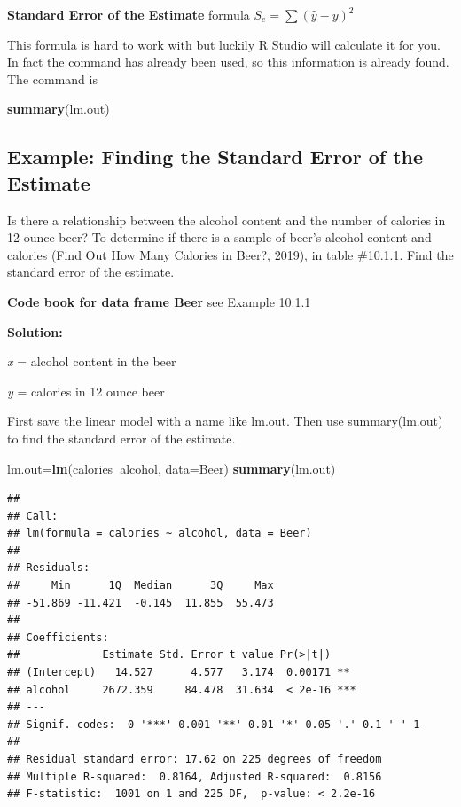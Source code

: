 \documentclass[
]{book}
\newenvironment{Shaded}{\begin{snugshade}}{\end{snugshade}}
\newcommand{\DataTypeTok}[1]{\textcolor[rgb]{0.13,0.29,0.53}{#1}}
\newcommand{\KeywordTok}[1]{\textcolor[rgb]{0.13,0.29,0.53}{\textbf{#1}}}
\newcommand{\NormalTok}[1]{#1}
\newcommand{\OperatorTok}[1]{\textcolor[rgb]{0.81,0.36,0.00}{\textbf{#1}}}
\begin{document}
\textbf{Standard Error of the Estimate} formula \(S_e=\sum{(\hat{y}-y)^2}\)

This formula is hard to work with but luckily R Studio will calculate it for you. In fact the command has already been used, so this information is already found. The command is

\begin{Shaded}
\begin{Highlighting}[]
\KeywordTok{summary}\NormalTok{(lm.out)}
\end{Highlighting}
\end{Shaded}

\hypertarget{example-finding-the-standard-error-of-the-estimate}{%
\subsection{Example: Finding the Standard Error of the Estimate}\label{example-finding-the-standard-error-of-the-estimate}}

Is there a relationship between the alcohol content and the number of calories in 12-ounce beer? To determine if there is a sample of beer's alcohol content and calories (Find Out How Many Calories in Beer?, 2019), in table \#10.1.1. Find the standard error of the estimate.

\textbf{Code book for data frame Beer} see Example 10.1.1

\textbf{Solution:}

\emph{x} = alcohol content in the beer

\emph{y} = calories in 12 ounce beer

First save the linear model with a name like lm.out. Then use summary(lm.out) to find the standard error of the estimate.

\begin{Shaded}
\begin{Highlighting}[]
\NormalTok{lm.out=}\KeywordTok{lm}\NormalTok{(calories}\OperatorTok{~}\NormalTok{alcohol, }\DataTypeTok{data=}\NormalTok{Beer)}
\KeywordTok{summary}\NormalTok{(lm.out)}
\end{Highlighting}
\end{Shaded}

\begin{verbatim}
## 
## Call:
## lm(formula = calories ~ alcohol, data = Beer)
## 
## Residuals:
##     Min      1Q  Median      3Q     Max 
## -51.869 -11.421  -0.145  11.855  55.473 
## 
## Coefficients:
##             Estimate Std. Error t value Pr(>|t|)    
## (Intercept)   14.527      4.577   3.174  0.00171 ** 
## alcohol     2672.359     84.478  31.634  < 2e-16 ***
## ---
## Signif. codes:  0 '***' 0.001 '**' 0.01 '*' 0.05 '.' 0.1 ' ' 1
## 
## Residual standard error: 17.62 on 225 degrees of freedom
## Multiple R-squared:  0.8164, Adjusted R-squared:  0.8156 
## F-statistic:  1001 on 1 and 225 DF,  p-value: < 2.2e-16
\end{verbatim}
\end{document}
